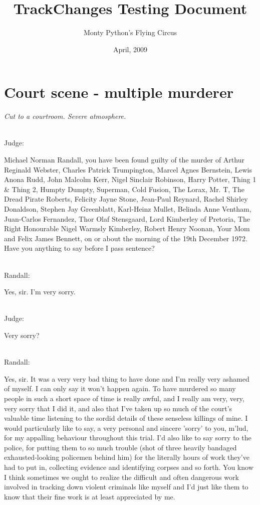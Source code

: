 \documentclass{report}
\title{TrackChanges Testing Document}
\author{Monty Python's Flying Circus}
\date{April, 2009}
\begin{document}
\maketitle

\chapter{Court scene - multiple murderer}

\emph{Cut to a courtroom. Severe atmosphere.}

\noindent\\ Judge:

Michael Norman Randall, you have been found guilty of the murder of Arthur Reginald Webster, Charles Patrick Trumpington, Marcel Agnes Bernstein, Lewis Anona Rudd, John Malcolm Kerr, Nigel Sinclair Robinson, Harry Potter, Thing 1 \& Thing 2, Humpty Dumpty, Superman, Cold Fusion, The Lorax, Mr. T, The Dread Pirate Roberts, Felicity Jayne Stone, Jean-Paul Reynard, Rachel Shirley Donaldson, Stephen Jay Greenblatt, Karl-Heinz Mullet, Belinda Anne Ventham, Juan-Carlos Fernandez, Thor Olaf Stensgaard, Lord Kimberley of Pretoria, The Right Honourable Nigel Warmsly Kimberley, Robert Henry Noonan, Your Mom and Felix James Bennett, on or about the morning of the 19th December 1972. Have you anything to say before I pass sentence?


\noindent\\ Randall: 	

Yes, sir. I'm very sorry.

\noindent\\ Judge: 	

Very sorry?

\noindent\\ Randall: 	

Yes, sir. It was a very very bad thing to have done and I'm really very ashamed of myself. I can only say it won't happen again. To have murdered so many people in such a short space of time is really awful, and I really am very, very, very sorry that I did it, and also that I've taken up so much of the court's valuable time listening to the sordid details of these senseless killings of mine. I would particularly like to say, a very personal and sincere 'sorry' to you, m'lud, for my appalling behaviour throughout this trial. I'd also like to say sorry to the police, for putting them to so much trouble (shot of three heavily bandaged exhausted-looking policemen behind him) for the literally hours of work they've had to put in, collecting evidence and identifying corpses and so forth. You know I think sometimes we ought to realize the difficult and often dangerous work involved in tracking down violent criminals like myself and I'd just like them to know that their fine work is at least appreciated by me.
\end{document}
